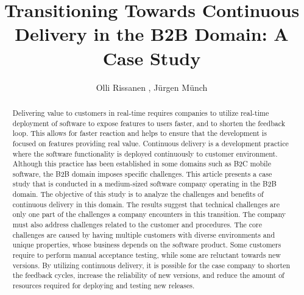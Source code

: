 \documentclass[lnbip]{svmultln}
\begin{document}
%
\mainmatter              %
%
\title{Transitioning Towards Continuous Delivery in the B2B Domain: A Case Study}
%
%
\author{Olli Rissanen , J{\"u}rgen M{\"u}nch 
}
%
%

\maketitle              %

\begin{abstract}        
Delivering value to customers in real-time requires companies to utilize real-time deployment of software to expose features to users faster, and to shorten the feedback loop. This allows for faster reaction and helps to ensure that the development is focused on features providing real value. Continuous delivery is a development practice where the software functionality is deployed continuously to customer environment. Although this practice has been established in some domains such as B2C mobile software, the B2B domain imposes specific challenges. This article presents a case study that is conducted in a medium-sized software company operating in the B2B domain. The objective of this study is to analyze the challenges and benefits of continuous delivery in this domain. The results suggest that technical challenges are only one part of the challenges a company encounters in this transition. The company must also address challenges related to the customer and procedures. The core challenges are caused by having multiple customers with diverse environments and unique properties, whose business depends on the software product. Some customers require to perform manual acceptance testing, while some are reluctant towards new versions. By utilizing continuous delivery, it is possible for the case company to shorten the feedback cycles, increase the reliability of new versions, and reduce the amount of resources required for deploying and testing new releases.

\end{abstract}
%
\end{document}
